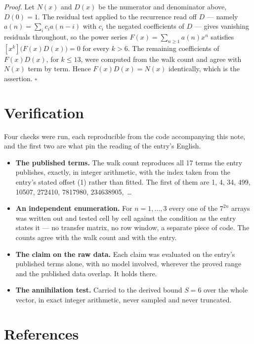 \documentclass[11pt]{article}
\theoremstyle{definition}
\begin{document}
{\itshape Proof.} Let $N(x)$ and $D(x)$ be the numerator and denominator above, $D(0)=1$. The residual test applied to the recurrence read off $D$ --- namely $a(n) = \sum_i c_i a(n-i)$ with $c_i$ the negated coefficients of $D$ --- gives vanishing residuals throughout, so the power series $F(x)=\sum_{n\ge 1}a(n)x^n$ satisfies $[x^k]\bigl(F(x)D(x)\bigr) = 0$ for every $k > 6$. The remaining coefficients of $F(x)D(x)$, for $k \le 13$, were computed from the walk count and agree with $N(x)$ term by term. Hence $F(x)D(x) = N(x)$ identically, which is the assertion. $\square$

\section{Verification}

Four checks were run, each reproducible from the code accompanying this note, and the first two are what pin the reading of the entry's English.

\begin{itemize}

\item {\bfseries The published terms.} The walk count reproduces all 17 terms the entry publishes, exactly, in integer arithmetic, with the index taken from the entry's stated offset (1) rather than fitted. The first of them are 1, 4, 34, 499, 10507, 272410, 7817980, 234638905,~\dots

\item {\bfseries An independent enumeration.} For $n = 1,\dots,3$ every one of the $7^{2n}$ arrays was written out and tested cell by cell against the condition as the entry states it --- no transfer matrix, no row window, a separate piece of code. The counts agree with the walk count and with the entry.

\item {\bfseries The claim on the raw data.} Each claim was evaluated on the entry's published terms alone, with no model involved, wherever the proved range and the published data overlap. It holds there.

\item {\bfseries The annihilation test.} Carried to the derived bound $S = 6$ over the whole vector, in exact integer arithmetic, never sampled and never truncated.

\end{itemize}

\section{References}
\end{document}
